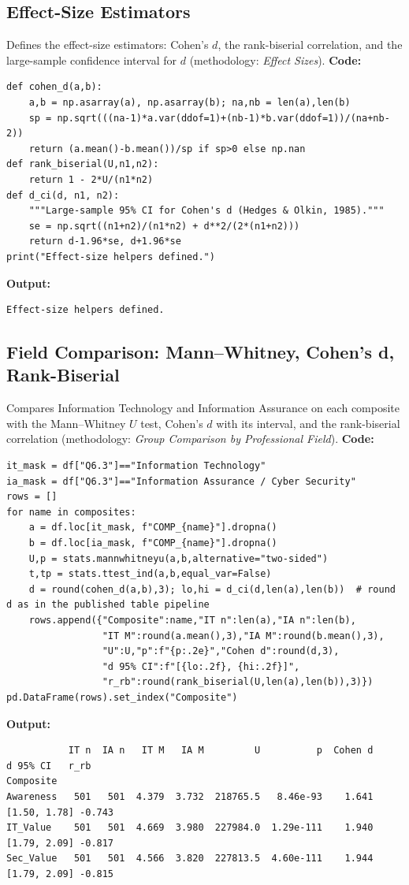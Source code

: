 \subsection{Effect-Size Estimators}
Defines the effect-size estimators: Cohen's $d$, the rank-biserial correlation, and the large-sample confidence interval for $d$ (methodology: \emph{Effect Sizes}).
\noindent\textbf{Code:}\nopagebreak
{\scriptsize\begin{verbatim}
def cohen_d(a,b):
    a,b = np.asarray(a), np.asarray(b); na,nb = len(a),len(b)
    sp = np.sqrt(((na-1)*a.var(ddof=1)+(nb-1)*b.var(ddof=1))/(na+nb-2))
    return (a.mean()-b.mean())/sp if sp>0 else np.nan
def rank_biserial(U,n1,n2):
    return 1 - 2*U/(n1*n2)
def d_ci(d, n1, n2):
    """Large-sample 95% CI for Cohen's d (Hedges & Olkin, 1985)."""
    se = np.sqrt((n1+n2)/(n1*n2) + d**2/(2*(n1+n2)))
    return d-1.96*se, d+1.96*se
print("Effect-size helpers defined.")
\end{verbatim}}
\noindent\textbf{Output:}\nopagebreak
{\scriptsize\begin{verbatim}
Effect-size helpers defined.
\end{verbatim}}

\subsection{Field Comparison: Mann--Whitney, Cohen's d, Rank-Biserial}
Compares Information Technology and Information Assurance on each composite with the Mann--Whitney $U$ test, Cohen's $d$ with its interval, and the rank-biserial correlation (methodology: \emph{Group Comparison by Professional Field}).
\noindent\textbf{Code:}\nopagebreak
{\tiny\begin{verbatim}
it_mask = df["Q6.3"]=="Information Technology"
ia_mask = df["Q6.3"]=="Information Assurance / Cyber Security"
rows = []
for name in composites:
    a = df.loc[it_mask, f"COMP_{name}"].dropna()
    b = df.loc[ia_mask, f"COMP_{name}"].dropna()
    U,p = stats.mannwhitneyu(a,b,alternative="two-sided")
    t,tp = stats.ttest_ind(a,b,equal_var=False)
    d = round(cohen_d(a,b),3); lo,hi = d_ci(d,len(a),len(b))  # round d as in the published table pipeline
    rows.append({"Composite":name,"IT n":len(a),"IA n":len(b),
                 "IT M":round(a.mean(),3),"IA M":round(b.mean(),3),
                 "U":U,"p":f"{p:.2e}","Cohen d":round(d,3),
                 "d 95% CI":f"[{lo:.2f}, {hi:.2f}]",
                 "r_rb":round(rank_biserial(U,len(a),len(b)),3)})
pd.DataFrame(rows).set_index("Composite")
\end{verbatim}}
\noindent\textbf{Output:}\nopagebreak
{\scriptsize\begin{verbatim}
           IT n  IA n   IT M   IA M         U          p  Cohen d      d 95% CI   r_rb
Composite
Awareness   501   501  4.379  3.732  218765.5   8.46e-93    1.641  [1.50, 1.78] -0.743
IT_Value    501   501  4.669  3.980  227984.0  1.29e-111    1.940  [1.79, 2.09] -0.817
Sec_Value   501   501  4.566  3.820  227813.5  4.60e-111    1.944  [1.79, 2.09] -0.815
\end{verbatim}}

